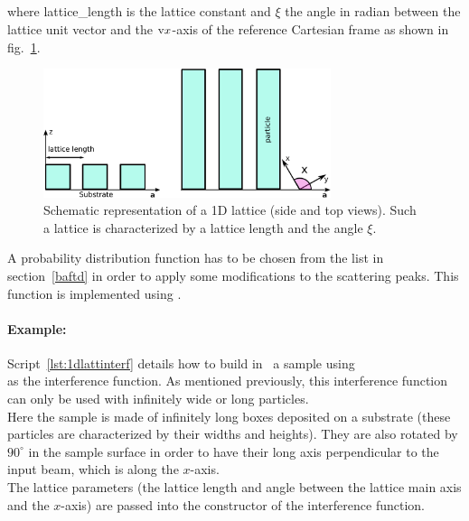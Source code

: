 \newpage
\subsection{}
where lattice\_length is the lattice constant and $\xi$ the angle in radian between the lattice unit vector and the $\text{v}{x}$-axis of the reference Cartesian frame as shown in fig.~\ref{fig:1dgrating}.

\begin{figure}[tb]
\begin{center}
\includegraphics[width=0.75\textwidth]{fig/drawing/1DGrating.pdf}
\end{center}
\caption{Schematic representation of a 1D lattice (side and top views). Such a lattice is characterized by a lattice length and the angle $\xi$.}
\label{fig:1dgrating}
\end{figure}


\vspace{12pt}
A probability distribution function  has to be chosen from the list in section~\ref{baftd} in order to apply some modifications to the scattering peaks. This function is implemented using .

\paragraph{Example:} Script~\ref{lst:1dlattinterf} details how to build in  \BornAgain\ a sample using\\  as the interference function. As mentioned previously, this interference function can only be used with infinitely wide or long particles.\\ Here the sample is made of infinitely long boxes deposited on a substrate (these particles are characterized by their widths and heights). They are also rotated by $90^{\circ}$  in the sample surface in order to have their long axis perpendicular to the input beam, which is along the $x$-axis.\\
 The lattice parameters (the lattice length and angle between the lattice main axis and the $x$-axis) are passed into the constructor of the interference function.

